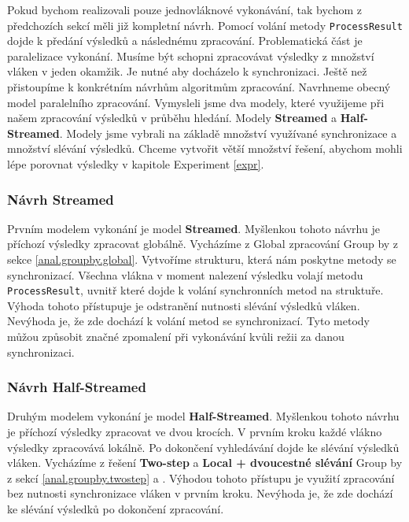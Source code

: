 Pokud bychom realizovali pouze jednovláknové vykonávání, tak bychom z předchozích sekcí měli již kompletní návrh.
Pomocí volání metody \texttt{ProcessResult} dojde k předání výsledků a následnému zpracování.
Problematická část je paralelizace vykonání.
Musíme být schopni zpracovávat výsledky z množství vláken v jeden okamžik.
Je nutné aby docházelo k synchronizaci.
Ještě než přistoupíme k konkrétním návrhům algoritmům zpracování.
Navrhneme obecný model paralelního zpracování.
Vymysleli jsme dva modely, které využijeme při našem zpracování výsledků v průběhu hledání.
Modely \textbf{Streamed} a \textbf{Half-Streamed}.
Modely jsme vybrali na základě množství využívané synchronizace a množství slévání výsledků.
Chceme vytvořit větší množství řešení, abychom mohli lépe porovnat výsledky v kapitole Experiment \ref{expr}.

\subsubsection{Návrh Streamed}

Prvním modelem vykonání je model \textbf{Streamed}.
Myšlenkou tohoto návrhu je příchozí výsledky zpracovat globálně.
Vycházíme z Global zpracování Group by z sekce \ref{anal.groupby.global}.
Vytvoříme strukturu, která nám poskytne metody se synchronizací.
Všechna vlákna v moment nalezení výsledku volají metodu \texttt{ProcessResult}, uvnitř které dojde k volání synchronních metod na struktuře.
Výhoda tohoto přístupuje je odstranění nutnosti slévání výsledků vláken.
Nevýhoda je, že zde dochází k volání metod se synchronizací.
Tyto metody můžou způsobit značné zpomalení při vykonávání kvůli režii za danou synchronizaci.

\subsubsection{Návrh Half-Streamed}

Druhým modelem vykonání je model \textbf{Half-Streamed}.
Myšlenkou tohoto návrhu je příchozí výsledky zpracovat ve dvou krocích.
V prvním kroku každé vlákno výsledky zpracovává lokálně.
Po dokončení vyhledávání dojde ke slévání výsledků vláken.
Vycházíme z řešení \textbf{Two-step} a \textbf{Local + dvoucestné slévání} Group by z sekcí \ref{anal.groupby.twostep} a \label{anal.groupby.local}.
Výhodou tohoto přístupu je využití zpracování bez nutnosti synchronizace vláken v prvním kroku.
Nevýhoda je, že zde dochází ke slévání výsledků po dokončení zpracování.

